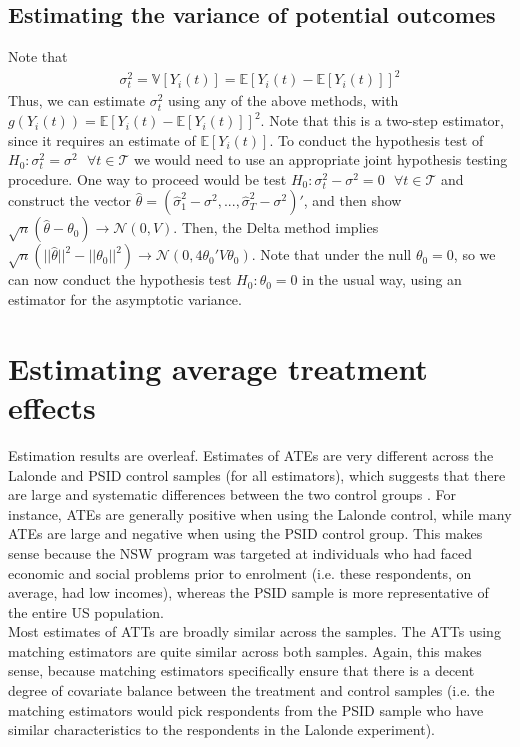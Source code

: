 \documentclass[12pt]{article}
\newcommand{\E}{\mathbb{E}}
\newcommand{\V}{\mathbb{V}}
\newcommand{\mtx}[1]{\ensuremath{\bm{\mathit{#1}}}}
\newcommand{\N}{\mathcal{N}}
\begin{document}
\subsection{Estimating the variance of potential outcomes}
Note that 
\begin{align*}
\sigma_t^2 = \V[Y_i(t)] = \E\left[Y_i(t) - \E[Y_i(t)]\right]^2
\end{align*}
Thus, we can estimate $\sigma_t^2$ using any of the above methods, with $g(Y_i(t)) = \E\left[Y_i(t) - \E[Y_i(t)]\right]^2$. Note that this is a two-step estimator, since it requires an estimate of $\E[Y_i(t)]$. To conduct the hypothesis test of $H_0: \sigma_t^2 = \sigma^2 \text{ } \forall t \in \mathcal{T}$ we would need to use an appropriate joint hypothesis testing procedure. One way to proceed would be test  $H_0: \sigma_t^2 - \sigma^2 =0 \text{ } \forall t \in \mathcal{T}$  and construct the vector $\widehat{\mtx{\theta}}= (\hat \sigma^2_1-\sigma^2,...,\hat\sigma^2_T-\sigma^2)'$, and then show $\sqrt{n}(\widehat{\mtx{\theta}}-\mtx{\theta}_0) \to \N(0,V)$. Then, the Delta method implies $\sqrt{n}(||\widehat{\mtx{\theta}}||^2-||\mtx{\theta}_0||^2) \to \N(0,4\mtx{\theta}_0'V\mtx{\theta}_0)$. Note that under the null $\mtx{\theta}_0=0$, so we can now conduct the hypothesis test $H_0: \mtx{\theta}_0=0$ in the usual way, using an estimator for the asymptotic variance.


\newpage
\section{Estimating average treatment effects}

Estimation results are overleaf. Estimates of ATEs are very different across the Lalonde and PSID control samples (for all estimators), which suggests that there are large and systematic differences between the two control groups . For instance, ATEs are generally positive when using the Lalonde control, while many ATEs are large and negative when using the PSID control group. This makes sense because the NSW program was targeted at individuals who had faced economic and social problems prior to enrolment (i.e. these respondents, on average, had low incomes), whereas the PSID sample is more representative of the entire US population. \\

Most estimates of ATTs are broadly similar across the samples. The ATTs using matching estimators are quite similar across both samples. Again, this makes sense, because matching estimators specifically ensure that there is a decent degree of covariate balance between the treatment and control samples (i.e. the matching estimators would pick respondents from the PSID sample who have similar characteristics to the respondents in the Lalonde experiment).\\
\end{document}

